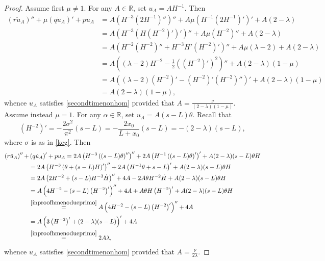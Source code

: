 \documentclass[11pt]{amsart}
\newcommand{\rr}{{\mathbb{R}}}
\theoremstyle{definition}
\theoremstyle{remark}
\numberwithin{equation}{section}
\begin{document}
\begin{proof}
Assume first $\mu\neq 1$. For any $A\in\rr$, set $u_A=A H^{-1}$. Then
\begin{equation*}
\begin{split}
\left(r \ddot u_A\right)''+\mu \left(q \dot u_A\right)' + pu_A&=A\left( H^{-3}\left(2H^{-1}\right)''\right)''+A\mu\left(H^{-1}\left(2H^{-1}\right)'\right)'+A(2-\lambda)\\
&=A\left( H^{-3}\left(H\left(H^{-2}\right)'\right)'\right)''+A\mu\left(H^{-2}\right)''+A(2-\lambda)\\
&=A\left( H^{-2}\left(H^{-2}\right)''+H^{-3}H'\left(H^{-2}\right)'\right)''+A\mu(\lambda-2)+A(2-\lambda)\\
&=A\left( (\lambda-2)H^{-2}-\frac{1}{2}\left(\left(H^{-2}\right)'\right)^2\right)''+A(2-\lambda)(1-\mu)\\
&=A\left( (\lambda-2)\left(H^{-2}\right)'-\left(H^{-2}\right)'\left(H^{-2}\right)''\right)'+A(2-\lambda)(1-\mu)\\
&=A(2-\lambda)(1-\mu),
\end{split}
\end{equation*}
whence $u_A$ satisfies \eqref{secondtimenonhom} provided that $A=\frac{\nu}{(2-\lambda)(1-\mu)}$.  Assume instead $\mu= 1$. For any $\alpha\in\rr$, set $u_A=A (s-L)\theta$. 
Recall that 
\begin{equation}\label{inproofhmenodueprimo}
\left(H^{-2}\right)'=-\frac{2\sigma^2}{\pi^2}(s-L)=-\frac{2 x_0}{ L+x_0 }(s-L)=-(2-\lambda)(s-L),
\end{equation}
where $\sigma$ is as in \eqref{keg}.  Then
\begin{equation*}
\begin{split}
\left(r \ddot u_A\right)''+& \left(q \dot u_A\right)' + pu_A=2A\left( H^{-3}\left((s-L)\theta\right)''\right)''+2A\left(H^{-1}\left((s-L)\theta\right)'\right)'+A(2-\lambda)(s-L)\theta H\\
&=2A\left( H^{-3}\left(\theta+(s-L)H\right)'\right)''+2A\left(H^{-1}\theta+s-L\right)'+A(2-\lambda)(s-L)\theta H\\
&=2A\left( 2H^{-2}+(s-L)H^{-3}\dot H\right)''+4A-2A\theta H^{-2}\dot H+A(2-\lambda)(s-L)\theta H\\
&=A\left( 4H^{-2}-(s-L)\left(H^{-2}\right)'\right)''+4A+A\theta H\left(H^{-2}\right)'+A(2-\lambda)(s-L)\theta H\\
&\overset{\eqref{inproofhmenodueprimo}}{=}A\left( 4H^{-2}-(s-L)\left(H^{-2}\right)'\right)''+4A\\
&=A\left( 3\left(H^{-2}\right)'+(2-\lambda)(s-L)\right)'+4A\\
&\overset{\eqref{inproofhmenodueprimo}}{=}2A\lambda,
\end{split}
\end{equation*}
whence $u_A$ satisfies \eqref{secondtimenonhom} provided that $A=\frac{\nu}{2\lambda}$.
\end{proof}
\end{document}

